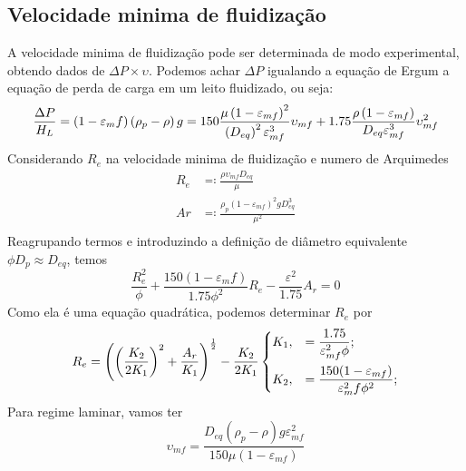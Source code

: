 \subsection{Velocidade minima de fluidização}
A velocidade minima de fluidização pode ser determinada de modo experimental, obtendo dados de
\(\Delta P \times \upsilon  \). Podemos achar \(\Delta P\) igualando a equação de Ergum a equação de
perda de carga em um leito fluidizado, ou seja:
\begin{equation}
    \frac{\Delta P}{H_{L}} = \left( 1 - \varepsilon _mf \right) \left( \rho _{p} -\rho  \right) g = 150 \frac{\mu \left( 1 - \varepsilon_{mf}  \right) ^{2} }{\left( D_{eq}  \right) ^{2} \varepsilon _{mf} ^{3} } \upsilon _{mf} + 1.75 \frac{\rho \left( 1 - \varepsilon _{mf}  \right) }{D_{eq} \varepsilon _{mf} ^{3} } \upsilon _{mf} ^{2} \\
\end{equation}
Considerando \(R_{e}\) na velocidade minima de fluidização e  numero de Arquimedes
\begin{align}
    R_{e} &\eqqcolon  \frac{\rho \upsilon _{mf} D_{eq} }{\mu } \\
    Ar &\eqqcolon  \frac{\rho _{p} \left( 1 - \varepsilon _{mf}  \right) ^{2} g D_{eq} ^{3} }{\mu ^{2} } \\ 
\end{align}
Reagrupando termos e introduzindo a definição de diâmetro equivalente \(\phi D_p \approx D_{eq} \),
temos
\begin{equation}
    \frac{R_e ^{2} }{\phi} + \frac{150 \left( 1 - \varepsilon _mf \right) }{1.75 \phi ^{2} } R_e - \frac{\varepsilon^{2}}{1.75}A_{r}=0
\end{equation}
Como ela é uma equação quadrática, podemos determinar \(R_{e}\) por
\begin{align}
    R_{e} = \left( \left( \frac{K_2}{2K_1} \right)^{2} + \frac{A_{r}}{K_1} \right)^\frac{1}{2} - \frac{K_2}{2K_1}
    \begin{dcases}
    K_1, &= \frac{1.75}{\varepsilon ^{2} _{mf}\phi} ;\\
    K_2, &= \frac{150 (1-\varepsilon _{mf})}{\varepsilon ^{2} _mf \phi ^{2} } ;\\
    \end{dcases} 
\end{align}
Para regime laminar, vamos ter
\begin{equation}
    \upsilon _{mf} = \frac{D_{eq} (\rho_{p} -\rho)g \varepsilon_{mf}^{2}}{150\mu \left( 1 - \varepsilon_{mf}  \right) }
\end{equation}

